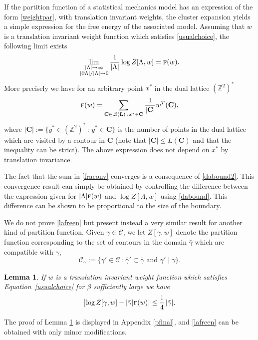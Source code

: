 \documentclass[JEP,XML,SOM,Unicode, NoFloatCountersInSection]{cedram}
\let\mathcal\mathscr
\newcommand{\sep}{\,:\,}
\numberwithin{equation}{section}
\theoremstyle{plain}
\newtheorem{lemma}[theorem]{Lemma}
\theoremstyle{definition}
\newcommand{\cQ}{{\ensuremath{\mathcal Q}} }
\newcommand{\cC}{{\ensuremath{\mathcal C}} }
\newcommand{\bC}{{\ensuremath{\mathbf C}} }
\newcommand{\bL}{{\ensuremath{\mathbf L}} }
\newcommand{\limtwo}[2]{\lim_{\substack{#1 \\ #2}}}
\newcommand{\bbZ}{{\ensuremath{\mathbb Z}} }
\newcommand{\gb}{\beta}
\newcommand{\gL}{\Lambda}
\newcommand{\tf}{\textsc{f}}
\begin{document}
If the partition function of a statistical mechanics model has an expression of the form \eqref{weightpar},
with translation invariant weights, the cluster expansion yields a simple expression for the free energy of the associated model.
Assuming that $w$ is a translation invariant weight function which satisfies \eqref{usualchoice},
the following limit exists\vspace*{-3pt}
\begin{equation}\label{lafreen}
\limtwo{|\gL| \to \infty}{|\partial\gL|/|\gL|\to 0} \frac{1}{|\gL|} \log Z[ \gL,w]=\tf(w).
\end{equation}
More precisely we have for an arbitrary point $x^*$ in the dual lattice $(\bbZ^2)^*$
\begin{equation}\label{fraconv}
\tf(w)=\sum_{\bC \in \cQ(\bL) \sep x^*\in \bC} \frac{1}{|\bC|}w^T(\bC),
\end{equation}
where $|\bC|:=\{y^*\in (\bbZ^2)^*\sep y^*\in \bC \}$ is the number of points in the dual lattice which are visited by a contour in $\bC$
(note that $|\bC|\le L(\bC)$ and that the inequality can be strict). The above expression does not depend on $x^*$ by translation invariance.

The fact that the sum in \eqref{fraconv} converges is a consequence of \eqref{dabound2}.
This convergence result can simply be obtained by controlling the difference between the expression given for
$|\gL|\tf(w)$ and $\log Z[ \gL,w]$ using \eqref{dabound}. This difference can be shown to be proportional to the size of the boundary.

We do not prove \eqref{lafreen} but present instead a very similar result for another kind of partition function. Given $\gamma\in \cC$, we let $Z[\gamma,w]$ denote the
partition function corresponding to the set of contours in the domain $\bar \gamma$ which are compatible with $\gamma$,
\begin{equation*}%
\cC_{\gamma}:= \{ \gamma'\in \cC \sep \bar \gamma'\subset \bar\gamma \text{ and } \gamma'\mid \gamma\}.
\end{equation*}

\begin{lemma}\label{finalfrontier}
If $w$ is a translation invariant weight function which satisfies Equation~\eqref{usualchoice} for $\gb$ sufficiently large
we have
\begin{equation*}
\bigl |\log Z[\gamma,w]- |\bar\gamma|\tf(w) \bigr|\le \frac 1 4\, |\tilde \gamma|.
\end{equation*}
\end{lemma}
The proof of Lemma \ref{finalfrontier} is displayed in Appendix \ref{pfinal}, and \eqref{lafreen} can be obtained with only minor modifications.
\end{document}
